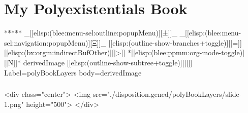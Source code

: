 \section{My Polyexistentials Book}

\begin{whenOrg}
*****  _[[elisp:(blee:menu-sel:outline:popupMenu)][±]]_ _[[elisp:(blee:menu-sel:navigation:popupMenu)][Ξ]]_ [[elisp:(outline-show-branches+toggle)][|=]] [[elisp:(bx:orgm:indirectBufOther)][|>]] *[[elisp:(blee:ppmm:org-mode-toggle)][|N]]*  derivedImage [[elisp:(outline-show-subtree+toggle)][||]] Label=polyBookLayers  body=derivedImage
\end{whenOrg}

\begin{htmlonly}

\begin{frame}[fragile,plain,label=polyBookLayers]
    \frametitle{}
    \framesubtitle{}
    \begin{rawhtml}
<div class="center">
<img src="./disposition.gened/polyBookLayers/slide-1.png" height="500">
</div>
    \end{rawhtml}
\end{frame}
\end{htmlonly}

